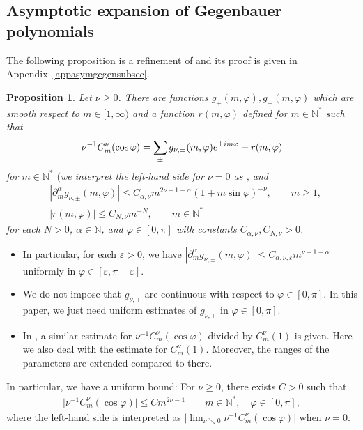 \documentclass[11pt]{article}
\numberwithin{equation}{section}
\newtheorem{Proposition}[Theorem]{Proposition}
 { \theoremstyle{definition}
\newtheorem{Definition}[Theorem]{Definition}
\newtheorem{Note}[Theorem]{Note}
\newtheorem{Example}[Theorem]{Example}
\newtheorem{Remark}[Theorem]{Remark} }
\def\a{\alpha}
\def\e{\varepsilon}
\def\f{\varphi}
\def\n{\nu}
\def\pa{\partial}
\begin{document}
\setcounter{section}{3}\setcounter{subsection}{1}\setcounter{Theorem}{2}
\subsection{Asymptotic expansion of Gegenbauer polynomials}

The following proposition is a refinement of \cite[Lemma 10.2]{IJ} and its proof is given in Appendix~\ref{appasymgegensubsec}.

\begin{Proposition}\label{Gegenasymp}
Let $\n\geq 0$.
There are functions $g_{+}(m,\f), g_{-}(m,\f)$ which are smooth respect to $m\in [1,\infty)$ and a function $r(m,\f)$ defined for $m\in\mathbb{N}^*$ such that
\begin{align*}
\n^{-1}C_m^{\n}(\cos\f)=\sum_{\pm}g_{\n,\pm}(m,\f){\rm e}^{\pm {\rm i}m\f}+r(m,\f)
\end{align*}
for $m\in \mathbb{N}^*$ $($we interpret the left-hand side for $\n=0$ as \smash{$\lim_{\n\searrow 0}\n^{-1}C_m^{\n}(\cos \f))$}, and
\begin{align*}
&|\pa_m^{\a}g_{\n,\pm}(m,\f)|\leq
C_{\a,\n}m^{2\n-1-\a}(1+m\sin\f)^{-\n},\qquad m\geq 1,\\
&|r(m,\f)|\leq C_{N,\n}m^{-N},\qquad m\in\mathbb{N}^*
\end{align*}
for each $N>0$, $\a\in\mathbb{N}$, and $\f\in [0,\pi]$ with constants $C_{\a,\n}, C_{N,\n}>0$.
\end{Proposition}

\begin{Remark}\quad
\begin{itemize}\itemsep=0pt
\item[(1)] In particular, for each $\e>0$, we have $|\pa_m^{\a}g_{\n,\pm}(m,\f)|\leq C_{\a,\n,\e}m^{\n-1-\a}$ uniformly in $\f\in [\e,\pi-\e]$.
\item[(2)] We do not impose that $g_{\n,\pm}$ are continuous with respect to $\f\in [0,\pi]$. In this paper, we just need uniform estimates of $g_{\n,\pm}$ in $\f\in [0,\pi]$.
\item[(3)]
In \cite[Lemma 10.2]{IJ}, a similar estimate for $\n^{-1}C_m^{\n}(\cos\f)$ divided by $C_m^{\n}(1)$ is given.
Here we also deal with the estimate for $C_m^{\n}(1)$.
Moreover, the ranges of the parameters are extended compared to there.
\end{itemize}
\end{Remark}

In particular, we have a uniform bound: For $\n\geq 0$, there exists $C>0$ such that
\begin{align}\label{Gegenunif}
\big|\n^{-1}C_m^{\n}(\cos \f)\big|\leq Cm^{2\n-1}\qquad m\in \mathbb{N}^*,\quad \f\in[0,\pi],
\end{align}
where the left-hand side is interpreted as $\big|\lim_{\n\searrow 0}\n^{-1}C_m^{\n}(\cos \f)\big|$ when $\n=0$.
\end{document}
